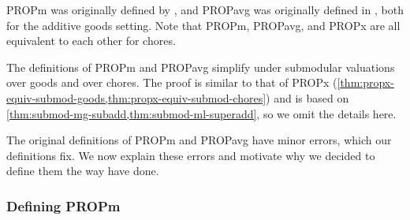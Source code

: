
PROPm was originally defined by \citet{baklanov2021achieving},
and PROPavg was originally defined in \citet{kobayashi2025proportional},
both for the additive goods setting.
Note that PROPm, PROPavg, and PROPx are all equivalent to each other for chores.

The definitions of PROPm and PROPavg simplify under submodular valuations over goods and over chores.
The proof is similar to that of PROPx (\cref{thm:propx-equiv-submod-goods,thm:propx-equiv-submod-chores})
and is based on \cref{thm:submod-mg-subadd,thm:submod-ml-superadd}, so we omit the details here.

The original definitions of PROPm and PROPavg have minor errors, which our definitions fix.
We now explain these errors and motivate why we decided to define them the way have done.

\subsubsection{Defining PROPm}
\label{sec:notions:propm}

